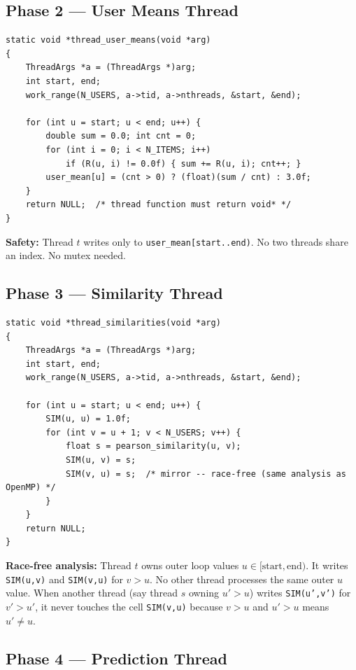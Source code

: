 \documentclass[12pt,a4paper]{article}
\begin{document}
\subsection{Phase 2 — User Means Thread}

\begin{lstlisting}
static void *thread_user_means(void *arg)
{
    ThreadArgs *a = (ThreadArgs *)arg;
    int start, end;
    work_range(N_USERS, a->tid, a->nthreads, &start, &end);

    for (int u = start; u < end; u++) {
        double sum = 0.0; int cnt = 0;
        for (int i = 0; i < N_ITEMS; i++)
            if (R(u, i) != 0.0f) { sum += R(u, i); cnt++; }
        user_mean[u] = (cnt > 0) ? (float)(sum / cnt) : 3.0f;
    }
    return NULL;  /* thread function must return void* */
}
\end{lstlisting}

\textbf{Safety:}  Thread $t$ writes only to \texttt{user\_mean[start..end)}.
No two threads share an index.  No mutex needed.

\subsection{Phase 3 — Similarity Thread}

\begin{lstlisting}
static void *thread_similarities(void *arg)
{
    ThreadArgs *a = (ThreadArgs *)arg;
    int start, end;
    work_range(N_USERS, a->tid, a->nthreads, &start, &end);

    for (int u = start; u < end; u++) {
        SIM(u, u) = 1.0f;
        for (int v = u + 1; v < N_USERS; v++) {
            float s = pearson_similarity(u, v);
            SIM(u, v) = s;
            SIM(v, u) = s;  /* mirror -- race-free (same analysis as OpenMP) */
        }
    }
    return NULL;
}
\end{lstlisting}

\textbf{Race-free analysis:}  Thread $t$ owns outer loop values $u \in
[\text{start}, \text{end})$.  It writes \texttt{SIM(u,v)} and
\texttt{SIM(v,u)} for $v > u$.  No other thread processes the same outer
$u$ value.  When another thread (say thread $s$ owning $u' > u$) writes
\texttt{SIM(u',v')} for $v' > u'$, it never touches the cell
\texttt{SIM(v,u)} because $v > u$ and $u' > u$ means $u' \neq u$.

\subsection{Phase 4 — Prediction Thread}
\end{document}
